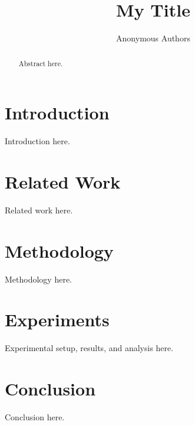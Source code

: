 \documentclass{article} %
\title{My Title}
\author{Anonymous Authors}
\begin{document}
\maketitle

\begin{abstract}
Abstract here.
\end{abstract}

\section{Introduction}
\label{sec:intro}
Introduction here.

\section{Related Work}
\label{sec:related_work}
Related work here.

\section{Methodology}
\label{sec:method}
Methodology here.

\section{Experiments}
\label{sec:experiments}
Experimental setup, results, and analysis here.

\section{Conclusion}
\label{sec:conclusion}
Conclusion here.




\end{document}
